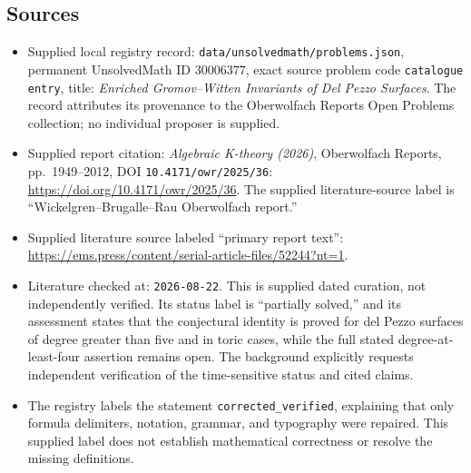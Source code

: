 \documentclass[11pt]{article}
\begin{document}
\subsection{Sources}
\begin{itemize}
\item Supplied local registry record: \texttt{data/unsolvedmath/problems.json}, permanent UnsolvedMath ID \(30006377\), exact source problem code \texttt{catalogue entry}, title: \emph{Enriched Gromov--Witten Invariants of Del Pezzo Surfaces}. The record attributes its provenance to the Oberwolfach Reports Open Problems collection; no individual proposer is supplied.
\item Supplied report citation: \emph{Algebraic K-theory (2026)}, Oberwolfach Reports, pp.\ 1949--2012, DOI \texttt{10.4171/owr/2025/36}: \url{https://doi.org/10.4171/owr/2025/36}. The supplied literature-source label is ``Wickelgren--Brugalle--Rau Oberwolfach report.''
\item Supplied literature source labeled ``primary report text'': \url{https://ems.press/content/serial-article-files/52244?nt=1}.
\item Literature checked at: \texttt{2026-08-22}. This is supplied dated curation, not independently verified. Its status label is ``partially solved,'' and its assessment states that the conjectural identity is proved for del Pezzo surfaces of degree greater than five and in toric cases, while the full stated degree-at-least-four assertion remains open. The background explicitly requests independent verification of the time-sensitive status and cited claims.
\item The registry labels the statement \texttt{corrected\_verified}, explaining that only formula delimiters, notation, grammar, and typography were repaired. This supplied label does not establish mathematical correctness or resolve the missing definitions.
\end{itemize}
\end{document}

